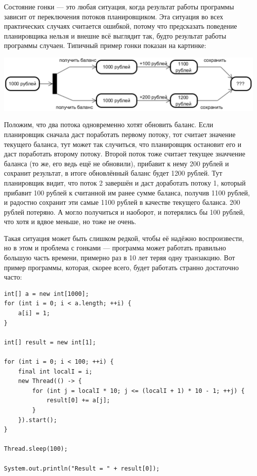 \documentclass[a5paper]{article}
\begin{document}
Состояние гонки --- это любая ситуация, когда результат работы программы зависит от переключения потоков планировщиком. Эта ситуация во всех практических случаях считается ошибкой, потому что предсказать поведение планировщика нельзя и внешне всё выглядит так, будто результат работы программы случаен. Типичный пример гонки показан на картинке:

\begin{center}
	\includegraphics[width=\textwidth]{raceCondition.png}
\end{center}

Положим, что два потока одновременно хотят обновить баланс. Если планировщик сначала даст поработать первому потоку, тот считает значение текущего баланса, тут может так случиться, что планировщик остановит его и даст поработать второму потоку. Второй поток тоже считает текущее значчение баланса (то же, его ведь ещё не обновили), прибавит к нему 200 рублей и сохранит результат, в итоге обновлённый баланс будет 1200 рублей. Тут планировщик видит, что поток 2 завершён и даст доработать потоку 1, который прибавит 100 рублей к считанной им ранее сумме баланса, получив 1100 рублей, и радостно сохранит эти самые 1100 рублей в качестве текущего баланса. 200 рублей потеряно. А могло получиться и наоборот, и потерялись бы 100 рублей, что хотя и вдвое меньше, но тоже не очень.

Такая ситуация может быть слишком редкой, чтобы её надёжно воспроизвести, но в этом и проблема с гонками --- программа может работать правильно большую часть времени, примерно раз в 10 лет теряя одну транзакцию. Вот пример программы, которая, скорее всего, будет работать странно достаточно часто:

\begin{verbatim}
int[] a = new int[1000];
for (int i = 0; i < a.length; ++i) {
    a[i] = 1;
}

int[] result = new int[1];

for (int i = 0; i < 100; ++i) {
    final int localI = i;
    new Thread(() -> {
        for (int j = localI * 10; j <= (localI + 1) * 10 - 1; ++j) {
            result[0] += a[j];
        }
    }).start();
}

Thread.sleep(100);

System.out.println("Result = " + result[0]);
\end{verbatim}
\end{document}
